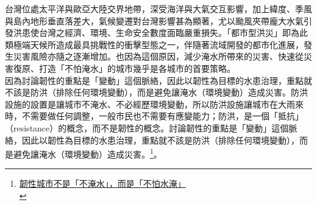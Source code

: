 \documentclass[a4paper,12pt]{article}
\begin{document}
台灣位處太平洋與歐亞大陸交界地帶，深受海洋與大氣交互影響，加上緯度、季風與島內地形垂直落差大，氣候變遷對台灣影響甚為顯著，尤以颱風夾帶龐大水氣引發洪患使台灣之經濟、環境、生命安全數度面臨嚴重損失。「都市型洪災」即為此類極端天候所造成最具挑戰性的衝擊型態之一，伴隨著流域開發的都市化進展，發生災害風險亦隨之逐漸增加。也因為這個原因，減少淹水所帶來的災害、快速從災害復原、打造「不怕淹水」的城市幾乎是各城市的首要策略。\\

因為討論韌性的重點是「變動」這個脈絡，因此以韌性為目標的水患治理，重點就不該是防洪（排除任何環境變動），而是避免讓淹水（環境變動）造成災害。防洪設施的設置是讓城市不淹水、不必經歷環境變動，所以防洪設施讓城市在大雨來時，不需要做任何調整，一般市民也不需要有應變能力；防洪，是一個「抵抗」（resistance）的概念，而不是韌性的概念。討論韌性的重點是「變動」這個脈絡，因此以韌性為目標的水患治理，重點就不該是防洪（排除任何環境變動），而是避免讓淹水（環境變動）造成災害。\footnote{\href{https://opinion.udn.com/opinion/story/8048/2501198}{韌性城市不是「不淹水」，而是「不怕水淹」}\\}。\\
\end{document}
